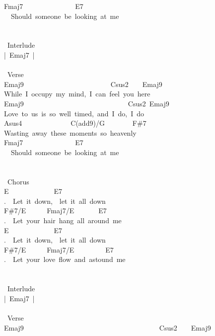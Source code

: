 {Fmaj7\ \ \ \ \ \ \ \ \ \ \ \ \ \ \ E7\\
\ \ Should\ someone\ be\ looking\ at\ me\\
\\
\\
\lbrack\ Interlude\rbrack\\
|\ Emaj7\ |\ %
\\
\\
\lbrack\ Verse\rbrack\\
Emaj9\ \ \ \ \ \ \ \ \ \ \ \ \ \ \ \ \ \ \ \ \ \ \ \ \ Csus2\ \ \ \ Emaj9\\
While\ I\ occupy\ my\ mind,\ I\ can\ feel\ you\ here\\
Emaj9\ \ \ \ \ \ \ \ \ \ \ \ \ \ \ \ \ \ \ \ \ \ \ \ \ \ \ \ \ \ Csus2\ Emaj9\\
Love\ to\ us\ is\ so\ well\ timed,\ and\ I\ do,\ I\ do\\
Asus4\ \ \ \ \ \ \ \ \ \ \ \ \ \ C(add9)/G\ \ \ \ \ \ \ \ F\#7\\
Wasting\ away\ these\ moments\ so\ heavenly\\
Fmaj7\ \ \ \ \ \ \ \ \ \ \ \ \ \ \ E7\\
\ \ Should\ someone\ be\ looking\ at\ me\\
\\
\\
\lbrack\ Chorus\rbrack\\
E\ \ \ \ \ \ \ \ \ \ \ \ \ E7\ \\
.\ \ Let\ it\ down,\ \ let\ it\ all\ down\\
F\#7/E\ \ \ \ \ \ Fmaj7/E\ \ \ \ \ \ \ E7\\
.\ \ Let\ your\ hair\ hang\ all\ around\ me\\
E\ \ \ \ \ \ \ \ \ \ \ \ \ E7\ \\
.\ \ Let\ it\ down,\ \ let\ it\ all\ down\\
F\#7/E\ \ \ \ \ \ Fmaj7/E\ \ \ \ \ \ \ \ \ E7\\
.\ \ Let\ your\ love\ flow\ and\ astound\ me\\
\\
\\
\lbrack\ Interlude\rbrack\\
|\ Emaj7\ |\ %
\\
\\
\lbrack\ Verse\rbrack\\
Emaj9\ \ \ \ \ \ \ \ \ \ \ \ \ \ \ \ \ \ \ \ \ \ \ \ \ \ \ \ \ \ \ \ \ \ \ \ \ \ \ Csus2\ \ \ \ Emaj9\\
}
